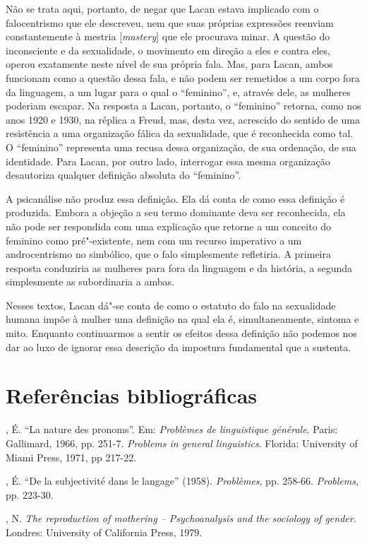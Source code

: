 Não se trata aqui, portanto, de negar que Lacan estava implicado com o
falocentrismo que ele descreveu, nem que suas próprias expressões
reenviam constantemente à mestria {[}\emph{mastery}{]} que ele procurava
minar. A questão do inconsciente e da sexualidade, o movimento em
direção a eles e contra eles, operou exatamente neste nível de sua
própria fala. Mas, para Lacan, ambos funcionam como a questão dessa
fala, e não podem ser remetidos a um corpo fora da linguagem, a um lugar
para o qual o ``feminino'', e, através dele, as mulheres poderiam
escapar. Na resposta a Lacan, portanto, o ``feminino'' retorna, como nos
anos 1920 e 1930, na réplica a Freud, mas, desta vez, acrescido do
sentido de uma resistência a uma organização fálica da sexualidade, que
é reconhecida como tal. O ``feminino'' representa uma recusa dessa
organização, de sua ordenação, de sua identidade. Para Lacan, por outro
lado, interrogar essa mesma organização desautoriza qualquer definição
absoluta do ``feminino''.

A psicanálise não produz essa definição. Ela dá conta de como essa
definição é produzida. Embora a objeção a seu termo dominante deva ser
reconhecida, ela não pode ser respondida com uma explicação que retorne
a um conceito do feminino como pré"-existente, nem com um recurso
imperativo a um androcentrismo no simbólico, que o falo simplesmente
refletiria. A primeira resposta conduziria as mulheres para fora da
linguagem e da história, a segunda simplesmente as subordinaria a ambas.

Nesses textos, Lacan dá"-se conta de como o estatuto do falo na
sexualidade humana impõe à mulher uma definição na qual ela é,
simultaneamente, sintoma e mito. Enquanto continuarmos a sentir os
efeitos dessa definição não podemos nos dar ao luxo de ignorar essa
descrição da impostura fundamental que a sustenta.

\section{Referências bibliográficas}

, É. ``La nature des pronoms''. Em: \emph{Problèmes de
linguistique générale}. Paris: Gallimard, 1966, pp. 251-7.
\emph{Problems in general linguistics}. Florida: University of Miami
Press, 1971, pp 217-22.

, É. ``De la subjectivité dans le langage'' (1958).
\emph{Problèmes}, pp. 258-66. \emph{Problems}, pp. 223-30.

, N. \emph{The reproduction of mothering -- Psychoanalysis and
the sociology of gender}. Londres: University of California Press,
1979.

